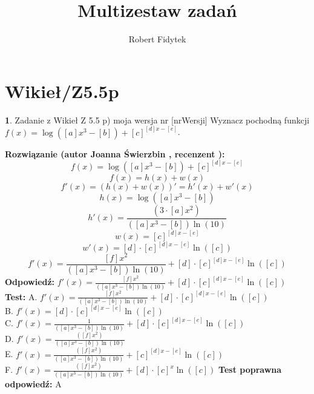 \documentclass[12pt, a4paper]{article}
\title{Multizestaw zadań}
\author{Robert Fidytek}
\date{}
\theoremstyle{definition} %
\newtheorem{zad}{}
\newcommand{\kategoria}[1]{\section{#1}} %
\newcommand{\zadStart}[1]{\begin{zad}#1\newline} %
\newcommand{\zadStop}{\end{zad}}   %
\newcommand{\rozwStart}[2]{\noindent \textbf{Rozwiązanie (autor #1 , recenzent #2): }\newline} %
\newcommand{\rozwStop}{\newline}                                            %
\newcommand{\odpStart}{\noindent \textbf{Odpowiedź:}\newline}    %
\newcommand{\odpStop}{\newline}                                             %
\newcommand{\testStart}{\noindent \textbf{Test:}\newline} %
\newcommand{\testStop}{\newline} %
\newcommand{\kluczStart}{\noindent \textbf{Test poprawna odpowiedź:}\newline} %
\newcommand{\kluczStop}{\newline} %
\begin{document}
\maketitle


\kategoria{Wikieł/Z5.5p}
\zadStart{Zadanie z Wikieł Z 5.5 p) moja wersja nr [nrWersji]}
Wyznacz pochodną funkcji \\ $f(x)=\log\left([a]x^3-[b]\right) +[c]^{[d]x-[e]} $.
\zadStop
\rozwStart{Joanna Świerzbin}{}
$$f(x)=\log\left([a]x^3-[b]\right) +[c]^{[d]x-[e]} $$
$$f(x)=h(x)+w(x)$$
$$f'(x)=(h(x)+w(x))'=h'(x)+w'(x)$$
$$h(x)=\log\left([a]x^3-[b]\right)$$
$$h'(x)=\frac{\left(3\cdot[a]x^2\right)}{\left([a]x^3-[b]\right)\ln{(10)}}$$
$$w(x)=[c]^{[d]x-[e]}$$
$$w'(x)=[d]\cdot[c]^{[d]x-[e]} \ln{([c])}$$
$$f'(x)= \frac{[f]x^2}{\left([a]x^3-[b]\right)\ln{(10)}} + [d]\cdot[c]^{[d]x-[e]} \ln{([c])} $$
\rozwStop
\odpStart
$f'(x)= \frac{[f]x^2}{\left([a]x^3-[b]\right)\ln{(10)}} + [d]\cdot[c]^{[d]x-[e]} \ln{([c])} $
\odpStop
\testStart
A. $f'(x)= \frac{[f]x^2}{\left([a]x^3-[b]\right)\ln{(10)}} + [d]\cdot[c]^{[d]x-[e]} \ln{([c])} $\\
B. $f'(x)= [d]\cdot[c]^{[d]x-[e]} \ln{([c])} $\\
C. $f'(x)= \frac{1}{\left([a]x^3-[b]\right)\ln{(10)}} + [d]\cdot[c]^{[d]x-[e]} \ln{([c])} $\\
D. $f'(x)= \frac{\left([f]x^2\right)}{\left([a]x^3-[b]\right)\ln{(10)}} $\\
E. $f'(x)= \frac{\left([f]x^2\right)}{\left([a]x^3-[b]\right)\ln{(10)}} + [c]^{[d]x-[e]} \ln{([c])} $\\
F. $f'(x)= \frac{\left([f]x^2\right)}{\left([a]x^3-[b]\right)\ln{(10)}} + [d]\cdot[c]^{x} \ln{([c])} $
\testStop
\kluczStart
A
\kluczStop
\end{document}
